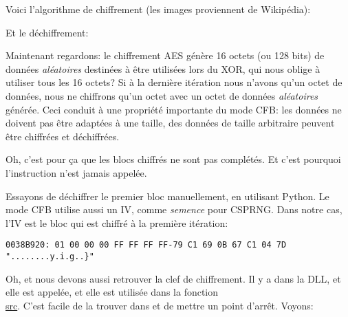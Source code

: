 Voici l'algorithme de chiffrement (les images proviennent de Wikipédia):

\begin{figure}[H]
\centering
{}
\end{figure}

Et le déchiffrement:

\begin{figure}[H]
\centering
{}
\label{fig:CFB_decryption}
\end{figure}

Maintenant regardons: le chiffrement AES génère 16 octets (ou 128 bits) de données
\emph{aléatoires} destinées à être utilisées lors du XOR, qui nous oblige à utiliser
tous les 16 octets?
Si à la dernière itération nous n'avons qu'un octet de données, nous ne chiffrons
qu'un octet avec un octet de données \emph{aléatoires} générée.
Ceci conduit à une propriété importante du mode \ac{CFB}: les données ne doivent
pas être adaptées à une taille, des données de taille arbitraire peuvent être chiffrées
et déchiffrées.

Oh, c'est pour ça que les blocs chiffrés ne sont pas complétés.
Et c'est pourquoi l'instruction  n'est jamais appelée.

Essayons de déchiffrer le premier bloc manuellement, en utilisant Python.
Le mode \ac{CFB} utilise aussi un \ac{IV}, comme \emph{semence} pour \ac{CSPRNG}.
Dans notre cas, l'\ac{IV} est le bloc qui est chiffré à la première itération:

\begin{lstlisting}
0038B920: 01 00 00 00 FF FF FF FF-79 C1 69 0B 67 C1 04 7D "........y.i.g..}"
\end{lstlisting}

Oh, et nous devons aussi retrouver la clef de chiffrement.
Il y a  dans la DLL, et elle est appelée, et elle est utilisée dans la fonction \\
\href{https://github.com/mmoss/cryptopp/blob/2772f7b57182b31a41659b48d5f35a7b6cedd34d/src/rijndael.cpp#L198}{src}.
C'est facile de la trouver dans \IDA et de mettre un point d'arrêt. Voyons:

